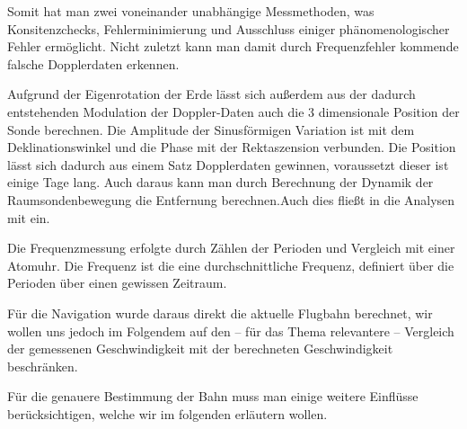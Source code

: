 Somit hat man zwei voneinander unabhängige Messmethoden, was Konsitenzchecks,
Fehlerminimierung und Ausschluss einiger phänomenologischer Fehler ermöglicht. Nicht zuletzt kann man damit durch Frequenzfehler kommende falsche Dopplerdaten erkennen.\cite{Anderson2002}

Aufgrund der Eigenrotation der Erde lässt sich außerdem aus der dadurch entstehenden Modulation der Doppler-Daten auch die 3 dimensionale Position der Sonde berechnen. Die Amplitude der Sinusförmigen Variation ist mit dem Deklinationswinkel und die Phase mit der Rektaszension verbunden. Die Position lässt sich dadurch aus einem Satz Dopplerdaten gewinnen, voraussetzt dieser ist einige Tage lang. Auch daraus kann man durch Berechnung der Dynamik der Raumsondenbewegung die Entfernung berechnen.Auch dies fließt in die Analysen mit ein.\cite{Anderson2002}

Die Frequenzmessung erfolgte durch Zählen der Perioden und Vergleich mit einer Atomuhr.\cite{Nieto2007} %
Die Frequenz ist die eine durchschnittliche Frequenz, definiert über die Perioden über einen gewissen Zeitraum.

Für die Navigation wurde daraus direkt die aktuelle Flugbahn berechnet, wir wollen uns jedoch im Folgendem auf den – für das Thema relevantere – 
Vergleich der gemessenen Geschwindigkeit mit der berechneten Geschwindigkeit beschränken. %

Für die genauere Bestimmung der Bahn muss man einige weitere Einflüsse berücksichtigen, welche wir im folgenden erläutern wollen.


